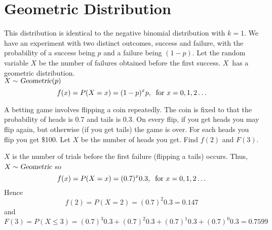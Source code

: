 \section{Geometric Distribution}
This distribution is identical to the negative binomial distribution with $k=1$. We have an experiment with two distinct outcomes, success and failure, with the probability of a success being $p$ and a failure being $(1-p)$. Let the random variable $X$ be the number of failures obtained before the first success. $X$~has a geometric distribution. \\
$X\sim\operatorname{\textsl{Geometric}}(p)$
\[
    f(x) = P(X = x) = (1 - p)^x p,\:\text{ for } x=0,1,2\ldots
\]
\begin{example}
A betting game involves flipping a coin repeatedly. The coin is fixed to that the probability of heads is 0.7 and tails is 0.3. On every flip, if you get heads you may flip again, but otherwise (if you get tails) the game is over. For each heads you flip you get \$100. Let $X$ be the number of heads you get. Find $f(2)$ and $F(3)$.
\par\smallskip
$X$ is the number of trials before the first failure (flipping a tails) occurs. Thus, $X \sim \operatorname{\textsl{Geometric}}$ so
\[
    f(x) = P(X = x) = (0.7)^x 0.3,\:\text{ for } x=0,1,2\ldots
\]
Hence
\[
    f(2) = P(X = 2) = (0.7)^2 0.3 = 0.147
\]
and
\[
    F(3) = P(X \leq 3) = (0.7)^3 0.3 + (0.7)^2 0.3 + (0.7)^1 0.3 + (0.7)^0 0.3 = 0.7599
\]
\end{example}
